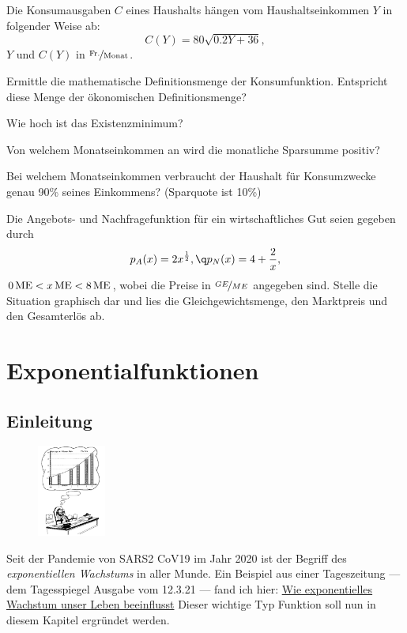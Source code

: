 \documentclass[%
11pt,%
twoside,%
titlepage,%
german,%
headsepline%
]{scrartcl}
\begin{document}
\begin{ueb}[Konsum]
Die Konsumausgaben $C$ eines Haushalts hängen vom Haushaltseinkommen $Y$ in folgender Weise ab:
$$C(Y) =80\sqrt{0.2Y+36},$$
$Y$ und $C(Y)$ in $\unitfrac{Fr.}{Monat}$.
\begin{enumeratea}
\item Ermittle die mathematische Definitionsmenge der Konsumfunktion. Entspricht diese Menge der ökonomischen Definitionsmenge?
\item Wie hoch ist das Existenzminimum?
\item Von welchem Monatseinkommen an wird die monatliche Sparsumme positiv?
\item Bei welchem Monatseinkommen verbraucht der Haushalt für Konsumzwecke genau 90\% seines Einkommens? (Sparquote ist 10\%)
\end{enumeratea}
\end{ueb}

\begin{ueb}
Die Angebots- und Nachfragefunktion für ein wirtschaftliches Gut seien gegeben durch
$$p_A(x)=2x^\frac{1}{2},\q p_N(x)=4+\frac{2}{x},$$
$\unit[0]{ME}<\unit[x]{ME}<\unit[8]{ME}$, wobei die Preise in $\nicefrac{GE}{ME}$ angegeben sind. Stelle die Situation graphisch dar und lies die Gleichgewichtsmenge, den Marktpreis und den Gesamterlös ab.
\end{ueb}

\section{Exponentialfunktionen}

\subsection{Einleitung}
\begin{figure}
  \begin{center}
    \includegraphics[width=0.2\textwidth]{pictures/dagobert}
  \end{center}
\end{figure}
Seit der Pandemie von SARS2 CoV19 im Jahr 2020 ist der Begriff des \emph{exponentiellen Wachstums} in aller Munde. Ein Beispiel aus einer Tageszeitung --- dem Tagesspiegel Ausgabe vom 12.3.21 --- fand ich hier:
    \href{https://www.tagesspiegel.de/wirtschaft/wie-exponentielles-wachstum-unser-leben-beeinflusst-4236517.html}{Wie exponentielles Wachstum unser Leben beeinflusst}
Dieser wichtige Typ Funktion soll nun in diesem Kapitel ergründet werden.
\end{document}

